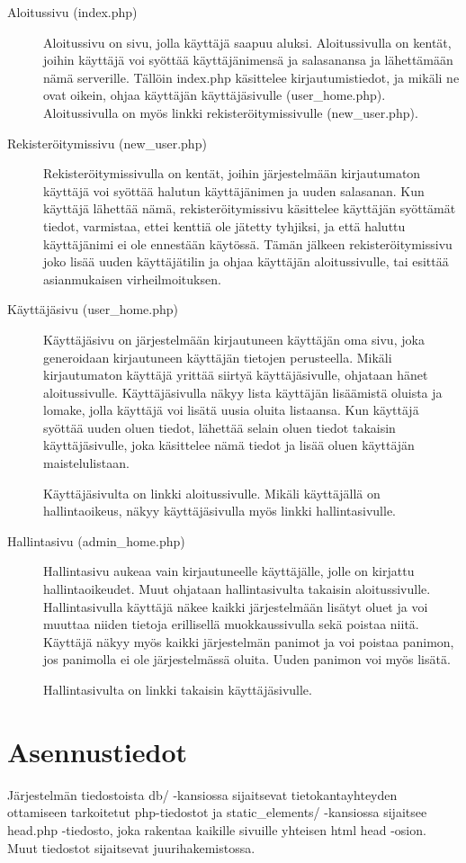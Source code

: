 \documentclass[12pt]{article}
\begin{document}
\begin{description}
\item[Aloitussivu (index.php)] Aloitussivu on sivu, jolla käyttäjä saapuu aluksi. Aloitussivulla on kentät, joihin käyttäjä voi syöttää käyttäjänimensä ja salasanansa ja lähettämään nämä serverille. Tällöin index.php käsittelee kirjautumistiedot, ja mikäli ne ovat oikein, ohjaa käyttäjän käyttäjäsivulle (user\_home.php). Aloitussivulla on myös linkki rekisteröitymissivulle (new\_user.php).

\item[Rekisteröitymissivu (new\_user.php)] Rekisteröitymissivulla on kentät, joihin järjestelmään kirjautumaton käyttäjä voi syöttää halutun käyttäjänimen ja uuden salasanan. Kun käyttäjä lähettää nämä, rekisteröitymissivu käsittelee käyttäjän syöttämät tiedot, varmistaa, ettei kenttiä ole jätetty tyhjiksi, ja että haluttu käyttäjänimi ei ole ennestään käytössä. Tämän jälkeen rekisteröitymissivu joko lisää uuden käyttäjätilin ja ohjaa käyttäjän aloitussivulle, tai esittää asianmukaisen virheilmoituksen.

\item[Käyttäjäsivu (user\_home.php)] Käyttäjäsivu on järjestelmään kirjautuneen käyttäjän oma sivu, joka generoidaan kirjautuneen käyttäjän tietojen perusteella. Mikäli kirjautumaton käyttäjä yrittää siirtyä käyttäjäsivulle, ohjataan hänet aloitussivulle. Käyttäjäsivulla näkyy lista käyttäjän lisäämistä oluista ja lomake, jolla käyttäjä voi lisätä uusia oluita listaansa. Kun käyttäjä syöttää uuden oluen tiedot, lähettää selain oluen tiedot takaisin käyttäjäsivulle, joka käsittelee nämä tiedot ja lisää oluen käyttäjän maistelulistaan.

Käyttäjäsivulta on linkki aloitussivulle. Mikäli käyttäjällä on hallintaoikeus, näkyy käyttäjäsivulla myös linkki hallintasivulle.

\item[Hallintasivu (admin\_home.php)] Hallintasivu aukeaa vain kirjautuneelle käyttäjälle, jolle on kirjattu hallintaoikeudet. Muut ohjataan hallintasivulta takaisin aloitussivulle. Hallintasivulla käyttäjä näkee kaikki järjestelmään lisätyt oluet ja voi muuttaa niiden tietoja erillisellä muokkaussivulla sekä poistaa niitä. Käyttäjä näkyy myös kaikki järjestelmän panimot ja voi poistaa panimon, jos panimolla ei ole järjestelmässä oluita. Uuden panimon voi myös lisätä.

Hallintasivulta on linkki takaisin käyttäjäsivulle.
\end{description}

\section{Asennustiedot}

Järjestelmän tiedostoista db/ -kansiossa sijaitsevat tietokantayhteyden ottamiseen tarkoitetut php-tiedostot ja static\_elements/ -kansiossa sijaitsee head.php -tiedosto, joka rakentaa kaikille sivuille yhteisen html head -osion. Muut tiedostot sijaitsevat juurihakemistossa.
\end{document}

